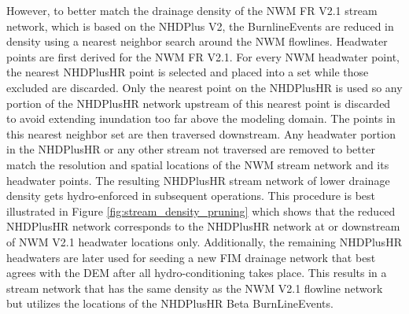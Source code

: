 \documentclass[draft]{dependencies/agujournal2019}
\begin{document}
However, to better match the drainage density of the NWM FR V2.1 stream network, which is based on the NHDPlus V2, the BurnlineEvents are reduced in density using a nearest neighbor search around the NWM flowlines.
Headwater points are first derived for the NWM FR V2.1.
For every NWM headwater point, the nearest NHDPlusHR point is selected and placed into a set while those excluded are discarded.
Only the nearest point on the NHDPlusHR is used so any portion of the NHDPlusHR network upstream of this nearest point is discarded to avoid extending inundation too far above the modeling domain.
The points in this nearest neighbor set are then traversed downstream.
Any headwater portion in the NHDPlusHR or any other stream not traversed are removed to better match the resolution and spatial locations of the NWM stream network and its headwater points.
The resulting NHDPlusHR stream network of lower drainage density gets hydro-enforced in subsequent operations.
This procedure is best illustrated in Figure \ref{fig:stream_density_pruning} which shows that the reduced NHDPlusHR network corresponds to the NHDPlusHR network at or downstream of NWM V2.1 headwater locations only. 
Additionally, the remaining NHDPlusHR headwaters are later used for seeding a new FIM drainage network that best agrees with the DEM after all hydro-conditioning takes place.
This results in a stream network that has the same density as the NWM V2.1 flowline network but utilizes the locations of the NHDPlusHR Beta BurnLineEvents. 
%
\end{document}
